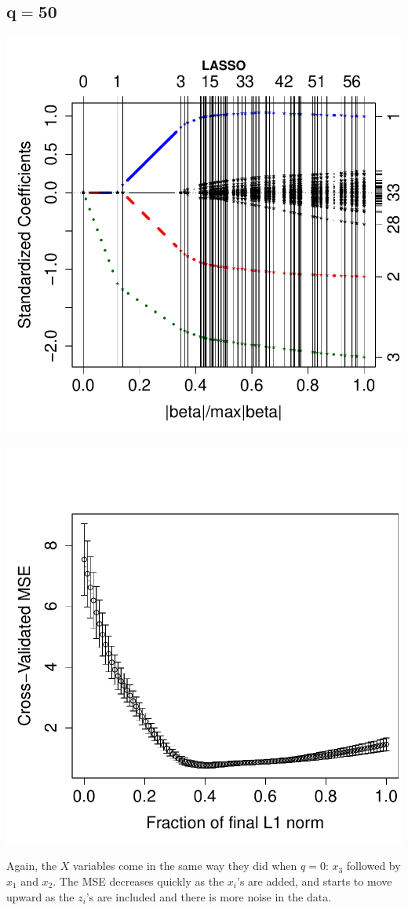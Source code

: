 \documentclass[a4paper]{article}
\begin{document}
\subsection{$\mathbf{q=50}$}
\vspace{-15pt}
\begin{minipage}[c]{0.6\linewidth}
\includegraphics{h4_ind-007}
\end{minipage}
\hspace{-50pt}
\begin{minipage}[c]{0.6\linewidth}
\includegraphics{h4_ind-008}
\end{minipage}
Again, the $X$ variables come in the same way they did when $q=0$:
$x_3$ followed by $x_1$ and $x_2$.  The MSE decreases
quickly as the $x_i$'s are added, and starts to move upward
as the $z_i$'s are included and there is more noise in the data.\\
\end{document}
